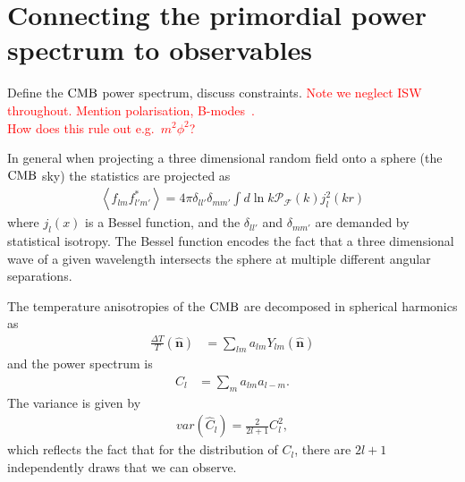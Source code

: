     \section{Connecting the primordial power spectrum to observables}
    Define the $\text{CMB}$ power spectrum, discuss constraints.
    \textcolor{red}{Note we neglect ISW throughout. Mention polarisation, B-modes~\cite{Baumann_bmodes_2014}.\\
    How does this rule out e.g.\ $m^2\phi^2$?}


    In general when projecting a three dimensional random field onto a sphere (the $\text{CMB}$ sky)
    the statistics are projected as
    \begin{align}
        \left<f_{lm}f^*_{l'm'}\right> = 4\pi \delta_{ll'}\delta_{mm'}
        \int d\ln k \mathcal{P}_{\mathcal{F}}(k) j_l^2(kr)
    \end{align}
    where $j_l(x)$ is a Bessel function, and the $\delta_{ll'}$ and $\delta_{mm'}$
    are demanded by statistical isotropy. The Bessel function encodes the fact that a three dimensional
    wave of a given wavelength intersects the sphere at multiple different angular separations.


    The temperature anisotropies of the $\text{CMB}$ are decomposed in spherical
    harmonics as
    \begin{align}
        \frac{\Delta T}{T}(\hat{\mathbf{n}}) &= \sum_{lm} a_{lm}Y_{lm}(\hat{\mathbf{n}})
    \end{align}
    and the power spectrum is
    \begin{align}
        C_l &= \sum_m a_{lm} a_{l-m}.
    \end{align}
    The variance is given by
    \begin{align}
        var\left(\hat{C}_l\right) = \frac{2}{2l+1} C^2_l,
    \end{align}
    which reflects the fact that for the distribution of $C_l$,
    there are $2l+1$ independently draws that we can observe.

